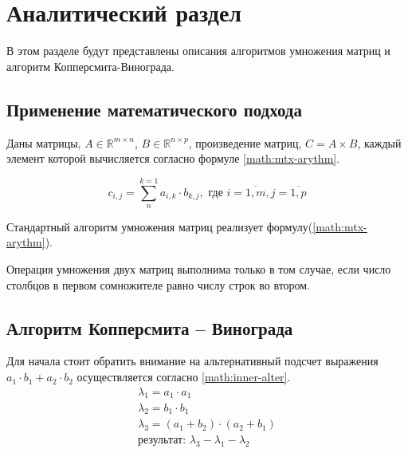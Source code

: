 \chapter{Аналитический раздел}\label{analyth}

В этом разделе будут представлены описания алгоритмов умножения матриц и алгоритм Копперсмита-Винограда.


\section{Применение математического подхода}
Даны матрицы, $A \in \mathbb{R}^{m \times n}$, $B \in \mathbb{R}^{n \times p}$, произведение матриц, $C = A \times B$, каждый элемент которой вычисляется согласно формуле \ref{math:mtx-arythm}.

\begin{equation}\label{math:mtx-arythm} 
	c_{i,j} = \sum_{n}^{k = 1}a_{i, k}\cdot b_{k, j}, \text{  где } i = \overline{1, m}, j = \overline{1, p} 
\end{equation}

\noindent 

Стандартный алгоритм умножения матриц реализует формулу(\ref{math:mtx-arythm}). 

Операция умножения двух матриц выполнима только в том случае, если число столбцов в первом сомножителе равно числу строк во втором.  

\section{Алгоритм Копперсмита – Винограда}
Для начала стоит обратить внимание на альтернативный подсчет выражения $a_1 \cdot b_1 + a_2 \cdot b_2$ осуществляется согласно \ref{math:inner-alter}.
\begin{equation}\label{math:inner-alter}
	\begin{array}{llll}
		\lambda_1 = a_1 \cdot a_1 \\
		\lambda_2 = b_1 \cdot b_1 \\
		\lambda_3 = (a_1 + b_2) \cdot (a_2 + b_1) \\
		\text{результат: } \lambda_3 - \lambda_1 - \lambda_2 \\ 
	\end{array}
\end{equation}

